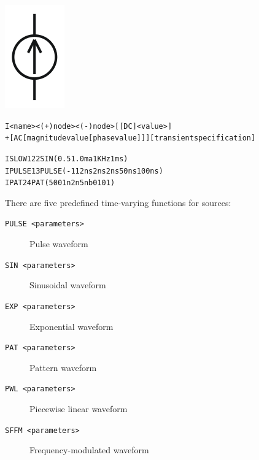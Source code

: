 


\begin{Device}\label{I_DEVICE}

\symbol
{\includegraphics{icsSymbol}}

\device
\begin{alltt}
I<name> <(+) node> <(-) node> [ [DC] <value> ]
+ [AC [magnitude value [phase value] ] ] [transient specification]
\end{alltt}

\examples
\begin{alltt}
ISLOW 1 22 SIN(0.5 1.0ma 1KHz 1ms)
IPULSE 1 3 PULSE(-1 1 2ns 2ns 2ns 50ns 100ns)
IPAT 2 4 PAT(5 0 0 1n 2n 5n b0101)
\end{alltt}

\parameters
\begin{Parameters}


There are five predefined time-varying functions for sources:

\begin{description}
\item[\tt PULSE <parameters>] Pulse waveform
\item[\tt SIN <parameters>] Sinusoidal waveform
\item[\tt EXP <parameters>] Exponential waveform
\item[\tt PAT <parameters>] Pattern waveform
\item[\tt PWL <parameters>] Piecewise linear waveform
\item[\tt SFFM <parameters>] Frequency-modulated waveform
\end{description}


\end{Parameters}
\end{Device}
